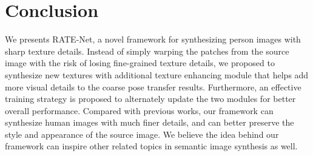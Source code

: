 \documentclass{article}
\begin{document}
\section{Conclusion}
We presents RATE-Net, a novel framework for synthesizing person images with sharp texture details. 
Instead of simply warping the patches from the source image with the risk of losing fine-grained texture details, we proposed to synthesize new textures with additional texture enhancing module that helps add more visual details to the coarse pose transfer results. Furthermore, an effective training strategy is proposed to alternately update the two modules for better overall performance. Compared with previous works, our framework can synthesize human images with much finer details, and can better preserve the style and appearance of the source image.
We believe the idea behind our framework can inspire other related topics in semantic image synthesis as well.






\end{document}
